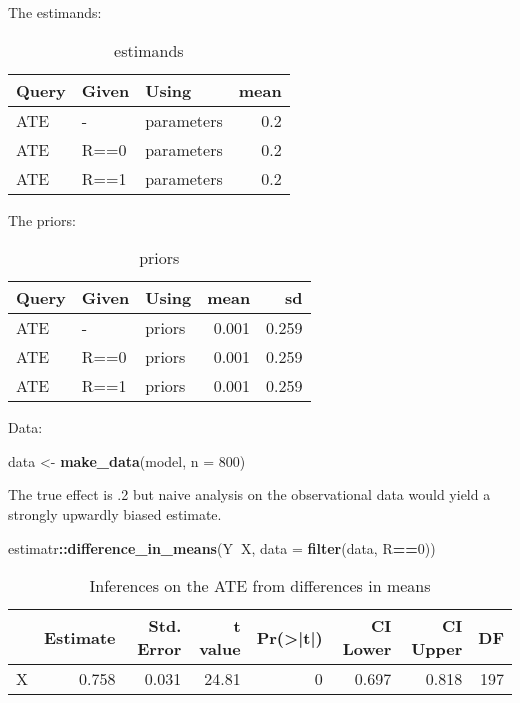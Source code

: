\documentclass[
  12pt,
]{book}
\newenvironment{Shaded}{\begin{snugshade}}{\end{snugshade}}
\newcommand{\DataTypeTok}[1]{\textcolor[rgb]{0.13,0.29,0.53}{#1}}
\newcommand{\DecValTok}[1]{\textcolor[rgb]{0.00,0.00,0.81}{#1}}
\newcommand{\KeywordTok}[1]{\textcolor[rgb]{0.13,0.29,0.53}{\textbf{#1}}}
\newcommand{\NormalTok}[1]{#1}
\newcommand{\OperatorTok}[1]{\textcolor[rgb]{0.81,0.36,0.00}{\textbf{#1}}}
\newcommand{\StringTok}[1]{\textcolor[rgb]{0.31,0.60,0.02}{#1}}
\begin{document}
The estimands:

\begin{table}

\caption{\label{tab:unnamed-chunk-114}estimands}
\centering
\begin{tabular}[t]{l|l|l|r}
\hline
Query & Given & Using & mean\\
\hline
ATE & - & parameters & 0.2\\
\hline
ATE & R==0 & parameters & 0.2\\
\hline
ATE & R==1 & parameters & 0.2\\
\hline
\end{tabular}
\end{table}

The priors:

\begin{table}

\caption{\label{tab:appcombexpobs2}priors}
\centering
\begin{tabular}[t]{l|l|l|r|r}
\hline
Query & Given & Using & mean & sd\\
\hline
ATE & - & priors & 0.001 & 0.259\\
\hline
ATE & R==0 & priors & 0.001 & 0.259\\
\hline
ATE & R==1 & priors & 0.001 & 0.259\\
\hline
\end{tabular}
\end{table}

Data:

\begin{Shaded}
\begin{Highlighting}[]
\NormalTok{data <-}\StringTok{ }\KeywordTok{make_data}\NormalTok{(model, }\DataTypeTok{n =} \DecValTok{800}\NormalTok{)}
\end{Highlighting}
\end{Shaded}

The true effect is .2 but naive analysis on the observational data would yield a strongly upwardly biased estimate.

\begin{Shaded}
\begin{Highlighting}[]
\NormalTok{estimatr}\OperatorTok{::}\KeywordTok{difference_in_means}\NormalTok{(Y}\OperatorTok{~}\NormalTok{X, }\DataTypeTok{data =} \KeywordTok{filter}\NormalTok{(data, R}\OperatorTok{==}\DecValTok{0}\NormalTok{))}
\end{Highlighting}
\end{Shaded}

\begin{table}

\caption{\label{tab:unnamed-chunk-117}Inferences on the ATE from differences in means}
\centering
\begin{tabular}[t]{l|r|r|r|r|r|r|r}
\hline
  & Estimate & Std. Error & t value & Pr(>|t|) & CI Lower & CI Upper & DF\\
\hline
X & 0.758 & 0.031 & 24.81 & 0 & 0.697 & 0.818 & 197\\
\hline
\end{tabular}
\end{table}
\end{document}
